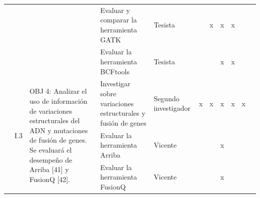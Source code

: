 \documentclass[a4paper,11pt]{article}
\begin{document}
\begin{table}[H]
\begin{tabular}{p{0.6cm}p{0.6cm}p{6cm}p{4cm}p{1cm}cccccc}
		&                       &                                                                                                                                                                                                                                                                                            & Evaluar y comparar la herramienta GATK                                                               & Tesista            &                       & \multicolumn{1}{c}{x}  & x                    & x                    &                       &                        \\
		&                       &                                                                                                                                                                                                                                                                                            & Evaluar la herramienta BCFtools                                                                      & Tesista            &                       &                        & x                    & x                    &                       &                        \\
		& \multirow{4}{*}{I.3}  & \multirow{4}{6cm}{OBJ 4: Analizar el uso de información de variaciones estructurales del ADN y mutaciones de fusión de genes. Se evaluará el desempeño de Arriba [41] y FusionQ [42].}                                                                                            & Investigar sobre variaciones estructurales y fusión de genes                                         & Segundo investigador               & \multicolumn{1}{c}{x} & \multicolumn{1}{c}{x}  & x                    & x                    & \multicolumn{1}{c}{x} &                        \\
		&                       &                                                                                                                                                                                                                                                                                            & Evaluar la herramienta Arriba                                                                        & Vicente            &                       &                        & x                    & \multicolumn{1}{l}{} &                       &                        \\
		&                       &                                                                                                                                                                                                                                                                                            & Evaluar la herramienta FusionQ                                                                       & Vicente            &                       &                        & x                    & \multicolumn{1}{l}{} &                       &                        \\

\end{tabular}
\end{table}
\end{document}
